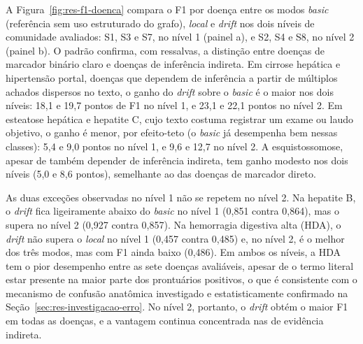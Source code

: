 A Figura~\ref{fig:res-f1-doenca} compara o F1 por doença entre os modos \textit{basic} (referência sem uso estruturado do grafo), \textit{local} e \textit{drift} nos dois níveis de comunidade avaliados: S1, S3 e S7, no nível 1 (painel a), e S2, S4 e S8, no nível 2 (painel b). O padrão confirma, com ressalvas, a distinção entre doenças de marcador binário claro e doenças de inferência indireta. Em cirrose hepática e hipertensão portal, doenças que dependem de inferência a partir de múltiplos achados dispersos no texto, o ganho do \textit{drift} sobre o \textit{basic} é o maior nos dois níveis: 18,1 e 19,7 pontos de F1 no nível 1, e 23,1 e 22,1 pontos no nível 2. Em esteatose hepática e hepatite C, cujo texto costuma registrar um exame ou laudo objetivo, o ganho é menor, por efeito-teto (o \textit{basic} já desempenha bem nessas classes): 5,4 e 9,0 pontos no nível 1, e 9,6 e 12,7 no nível 2. A esquistossomose, apesar de também depender de inferência indireta, tem ganho modesto nos dois níveis (5,0 e 8,6 pontos), semelhante ao das doenças de marcador direto.

As duas exceções observadas no nível 1 não se repetem no nível 2. Na hepatite B, o \textit{drift} fica ligeiramente abaixo do \textit{basic} no nível 1 (0,851 contra 0,864), mas o supera no nível 2 (0,927 contra 0,857). Na hemorragia digestiva alta (HDA), o \textit{drift} não supera o \textit{local} no nível 1 (0,457 contra 0,485) e, no nível 2, é o melhor dos três modos, mas com F1 ainda baixo (0,486). Em ambos os níveis, a HDA tem o pior desempenho entre as sete doenças avaliáveis, apesar de o termo literal estar presente na maior parte dos prontuários positivos, o que é consistente com o mecanismo de confusão anatômica investigado e estatisticamente confirmado na Seção~\ref{sec:res-investigacao-erro}. No nível 2, portanto, o \textit{drift} obtém o maior F1 em todas as doenças, e a vantagem continua concentrada nas de evidência indireta.

